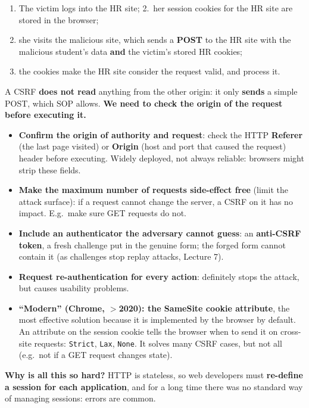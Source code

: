 \begin{warnbox}[title={Why SOP does not stop CSRF}]
\begin{enumerate}
  \item The victim logs into the HR site; 2.~her session cookies for the HR site are stored in the
        browser;
  \setcounter{enumi}{2}
  \item she visits the malicious site, which sends a \textbf{POST} to the HR site with the
        malicious student's data \textbf{and} the victim's stored HR cookies;
  \item the cookies make the HR site consider the request valid, and process it.
\end{enumerate}
A CSRF \textbf{does not read} anything from the other origin: it only \textbf{sends} a simple POST,
which SOP allows. \textbf{We need to check the origin of the request before executing it.}
\end{warnbox}

\begin{propbox}[title={How to avoid CSRF}]
\begin{itemize}
  \item \textbf{Confirm the origin of authority and request}: check the HTTP \textbf{Referer} (the
        last page visited) or \textbf{Origin} (host and port that caused the request) header
        before executing. Widely deployed, not always reliable: browsers might strip these fields.
  \item \textbf{Make the maximum number of requests side-effect free} (limit the attack surface):
        if a request cannot change the server, a CSRF on it has no impact. E.g.\ make sure GET
        requests do not.
  \item \textbf{Include an authenticator the adversary cannot guess}: an \textbf{anti-CSRF token},
        a fresh challenge put in the genuine form; the forged form cannot contain it (as
        challenges stop replay attacks, Lecture 7).
  \item \textbf{Request re-authentication for every action}: definitely stops the attack, but
        causes usability problems.
  \item \textbf{``Modern'' (Chrome, $>$2020): the SameSite cookie attribute}, the most effective
        solution because it is implemented by the browser by default. An attribute on the session
        cookie tells the browser when to send it on cross-site requests: \texttt{Strict},
        \texttt{Lax}, \texttt{None}. It solves many CSRF cases, but not all (e.g.\ not if a GET
        request changes state).
\end{itemize}
\textbf{Why is all this so hard?} HTTP is stateless, so web developers must \textbf{re-define a
session for each application}, and for a long time there was no standard way of managing sessions:
errors are common.
\end{propbox}

